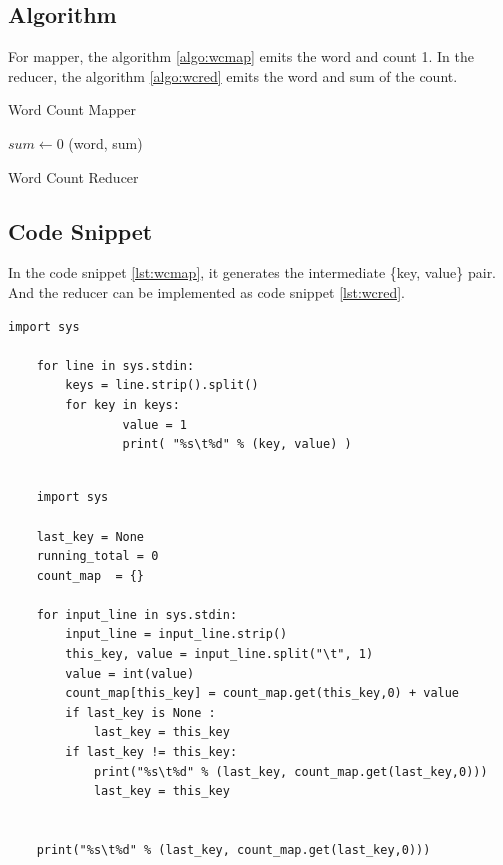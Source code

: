 \documentclass{article}
\begin{document}
\subsection{Algorithm}
For mapper, the algorithm \ref{algo:wcmap} emits the word and count 1. In the reducer, the algorithm \ref{algo:wcred} emits the word and sum of the count.
\BlankLine
\IncMargin{1em}
\begin{algorithm}
\DontPrintSemicolon
{}
\BlankLine
{}
\caption{Word Count Mapper\label{algo:wcmap}}
\end{algorithm}
\DecMargin{1em}

\IncMargin{1em}
\begin{algorithm}
\DontPrintSemicolon
{}
\BlankLine
$sum\leftarrow $0\;
\emit(word, sum)\;
\caption{Word Count Reducer\label{algo:wcred}}
\end{algorithm}
\DecMargin{1em}
\subsection{Code Snippet}
In the code snippet \ref{lst:wcmap}, it generates the intermediate \{key, value\} pair. And the reducer can be implemented as code snippet \ref{lst:wcred}.


\begin{lstlisting}[caption={Word count mapper code},label={lst:wcmap},style=MyPythonStyle]
	import sys

	for line in sys.stdin:
		keys = line.strip().split()
		for key in keys:
	        	value = 1
	        	print( "%s\t%d" % (key, value) )

\end{lstlisting}

\BlankLine
\begin{lstlisting}[caption={Word count reducer code},label={lst:wcred},style=MyPythonStyle]

	import sys

	last_key = None
	running_total = 0
	count_map  = {}

	for input_line in sys.stdin:
		input_line = input_line.strip()
		this_key, value = input_line.split("\t", 1)
		value = int(value)
		count_map[this_key] = count_map.get(this_key,0) + value
		if last_key is None :
			last_key = this_key
		if last_key != this_key:
			print("%s\t%d" % (last_key, count_map.get(last_key,0)))
			last_key = this_key


	print("%s\t%d" % (last_key, count_map.get(last_key,0)))
\end{lstlisting}
\end{document}
